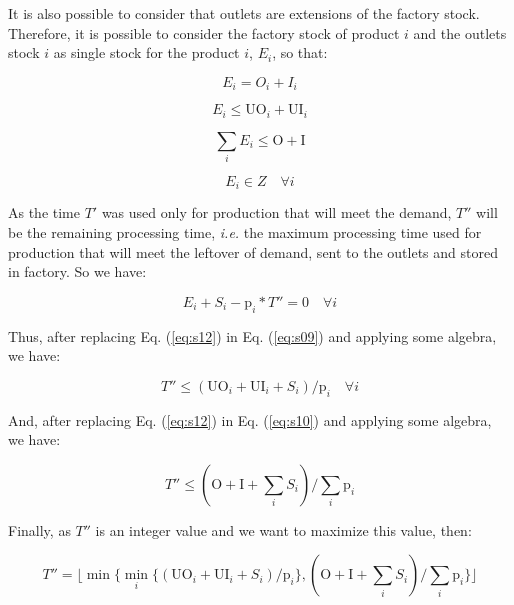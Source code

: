 \documentclass[10pt,fleqn,a4paper,twoside]{article}
\begin{document}
It is also possible to consider that outlets are extensions of the factory stock. Therefore, it is possible to consider the factory stock of product $i$ and the outlets stock $i$ as single stock for the product $i$, $E_i$, so that:

\begin{equation}
\label{eq:s08}
E_i = O_i + I_i
\end{equation}

\begin{equation}
\label{eq:s09}
E_i \leq \textrm{UO}_i + \textrm{UI}_i
\end{equation}

\begin{equation}
\label{eq:s10}
\sum_i {E_i} \leq \textrm{O} + \textrm{I}
\end{equation}

\begin{equation}
\label{eq:s11}
E_i \in Z \quad \forall i
\end{equation}

As the time $T'$ was used only for production that will meet the demand, $T''$  will be the remaining processing time, \emph{i.e.} the maximum processing time used for production that will meet the leftover of demand, sent to the outlets and stored in factory. So we have:

\begin{equation}
\label{eq:s12}
E_i + S_i - \textrm{p}_i * T''  = 0 \quad \forall i
\end{equation}

\noindent Thus, after replacing Eq. (\ref{eq:s12}) in Eq. (\ref{eq:s09}) and applying some algebra, we have:

\begin{equation}
\label{eq:s13}
T''  \leq (\textrm{UO}_i + \textrm{UI}_i + S_i) / \textrm{p}_i \quad \forall i
\end{equation}

\noindent And, after replacing Eq. (\ref{eq:s12}) in Eq. (\ref{eq:s10}) and applying some algebra, we have:

\begin{equation}
\label{eq:s14}
 T'' \leq (\textrm{O} + \textrm{I} + \sum_i S_i) / \sum_i \textrm{p}_i
\end{equation}

Finally, as $T''$  is an integer value and we want to maximize this value, then:

\begin{equation}
\label{eq:s15}
 T'' = \lfloor\min\{\min_i\{ (\textrm{UO}_i + \textrm{UI}_i + S_i) / \textrm{p}_i\}, (\textrm{O} + \textrm{I} + \sum_i S_i) / \sum_i \textrm{p}_i \}\rfloor
\end{equation}
\end{document}

